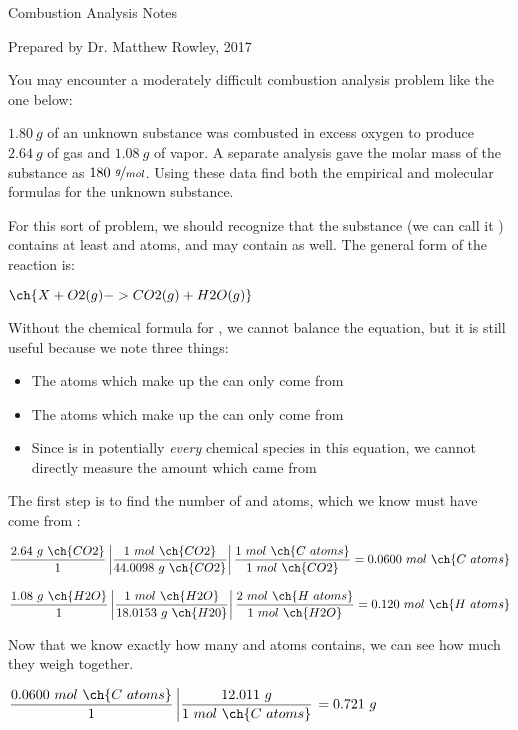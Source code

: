 \documentclass[12pt, openany, letterpaper]{memoir}
\begin{document}
\begin{center}
{\Large Combustion Analysis Notes}

Prepared by Dr. Matthew Rowley, 2017
\end{center}

You may encounter a moderately difficult combustion analysis problem like the one below:

\begin{mdframed}
\noindent $1.80~g$ of an unknown substance was combusted in excess oxygen to produce $2.64~g$ of  gas and $1.08~g$ of  vapor. A separate analysis gave the molar mass of the substance as $180~\nicefrac{g}{mol}$. Using these data find both the empirical and molecular formulas for the unknown substance.
\end{mdframed}

For this sort of problem, we should recognize that the substance (we can call it ) contains at least  and  atoms, and may contain  as well. The general form of the reaction is:

$\ch{X + O2(g) -> CO2(g) + H2O(g)}$

Without the chemical formula for , we cannot balance the equation, but it is still useful because we note three things:
\begin{itemize}
	\item The  atoms which make up the  can only come from 
	\item The  atoms which make up the  can only come from 
	\item Since  is in potentially \emph{every} chemical species in this equation, we cannot directly measure the amount which came from 
\end{itemize}

The first step is to find the number of  and  atoms, which we know must have come from :

$\dfrac{2.64~g~\ch{CO2}}{1} \left|\dfrac{1~mol~\ch{CO2}}{44.0098~g~\ch{CO2}}\right| \dfrac{1~mol~\ch{C~atoms}}{1~mol~\ch{CO2}} = 0.0600~mol~\ch{C~atoms}$

$\dfrac{1.08~g~\ch{H2O}}{1} \left|\dfrac{1~mol~\ch{H2O}}{18.0153~g~\ch{H20}}\right| \dfrac{2~mol~\ch{H~atoms}}{1~mol~\ch{H2O}} = 0.120~mol~\ch{H~atoms}$

Now that we know exactly how many  and  atoms  contains, we can see how much they weigh together.

$\dfrac{0.0600~mol~\ch{C~atoms}}{1}\left|\dfrac{12.011~g}{1~mol~\ch{C~atoms}}\right. = 0.721~g$
\end{document}

